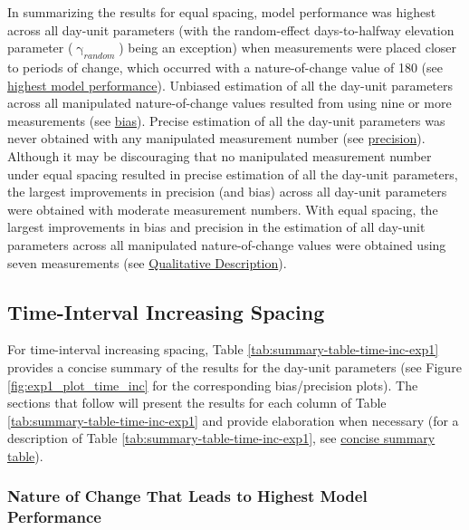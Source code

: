 \documentclass[
12pt, %
twoside,
english]{guelphthesis}
\begin{document}
In summarizing the results for equal spacing, model performance was highest across all day-unit parameters (with the random-effect days-to-halfway elevation parameter (\(\upgamma_{random}\)) being an exception) when measurements were placed closer to periods of change, which occurred with a nature-of-change value of 180 (see \protect\hyperlink{nature-change-equal-exp1}{highest model performance}). Unbiased estimation of all the day-unit parameters across all manipulated nature-of-change values resulted from using nine or more measurements (see \protect\hyperlink{bias-equal-exp1}{bias}). Precise estimation of all the day-unit parameters was never obtained with any manipulated measurement number (see \protect\hyperlink{precision-equal-exp1}{precision}). Although it may be discouraging that no manipulated measurement number under equal spacing resulted in precise estimation of all the day-unit parameters, the largest improvements in precision (and bias) across all day-unit parameters were obtained with moderate measurement numbers. With equal spacing, the largest improvements in bias and precision in the estimation of all day-unit parameters across all manipulated nature-of-change values were obtained using seven measurements (see \protect\hyperlink{qualitative-equal-exp1}{Qualitative Description}).

\hypertarget{time-interval-increasing-spacing}{%
\subsection{Time-Interval Increasing Spacing}\label{time-interval-increasing-spacing}}

For time-interval increasing spacing, Table \ref{tab:summary-table-time-inc-exp1} provides a concise summary of the results for the day-unit parameters (see Figure \ref{fig:exp1_plot_time_inc} for the corresponding bias/precision plots). The sections that follow will present the results for each column of Table \ref{tab:summary-table-time-inc-exp1} and provide elaboration when necessary (for a description of Table \ref{tab:summary-table-time-inc-exp1}, see \protect\hyperlink{concise-tab}{concise summary table}).

\hypertarget{nature-change-time-inc-exp1}{%
\subsubsection{Nature of Change That Leads to Highest Model Performance}\label{nature-change-time-inc-exp1}}
\end{document}
